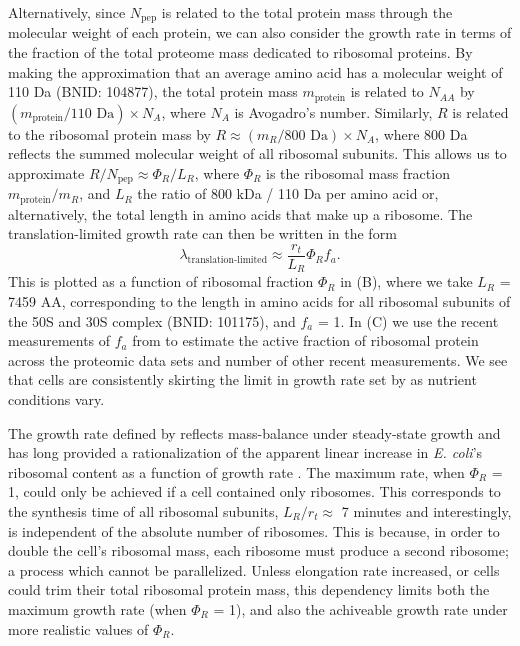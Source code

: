 Alternatively, since $N_\text{pep}$ is related to the total protein mass through
the molecular weight of each protein, we can also consider the growth rate in
terms of the fraction of the total proteome mass dedicated to ribosomal
proteins. By making the approximation that an average amino acid has a molecular
weight of 110 Da (BNID: 104877), the total protein mass $m_{\textrm{protein}}$
is related to $N_{AA}$ by $(m_{\textrm{protein}}/\text{110 Da}) \times N_A$,
where $N_A$ is Avogadro's number. Similarly, $R$ is related to the ribosomal
protein mass by $R \approx (m_R/\text{800 Da}) \times N_A$, where 800 Da
reflects the summed molecular weight of all ribosomal subunits.  This allows us
to approximate  $R / N_\text{pep} \approx \Phi_R / L_R$,  where $\Phi_R$ is the
ribosomal mass fraction $m_{\textrm{protein}}/m_R$, and $L_R$ the ratio of 800
kDa / 110 Da per amino acid or, alternatively, the total length in amino acids
that make up a ribosome. The translation-limited growth rate can then be written
in the form
\begin{equation}
\lambda_{\textrm{translation-limited}} \approx \frac{r_t}{L_R}  \Phi_R f_a.
\label{eq:translation_limit_growth_rate}
\end{equation}
This is plotted as a function of ribosomal fraction $\Phi_R$ in
(B), where we take $L_R$ = 7459 AA, corresponding to the
length in amino acids for all ribosomal subunits of the 50S and 30S complex
(BNID: 101175), and $f_a$ = 1. In (C) we use the
recent measurements of $f_a$ from \cite{dai2016} to estimate the active fraction of
ribosomal protein across the proteomic data sets and number of other recent
measurements. We see that cells are consistently skirting the limit in growth
rate set by  as nutrient conditions vary.

The growth rate defined by  reflects
mass-balance under steady-state growth and has long provided a rationalization
of the apparent linear increase in \textit{E. coli}'s ribosomal content as a
function of growth rate \citep{goldberger1979, scott2010}. The maximum rate,
when $\Phi_R$ = 1, could only be achieved if a cell contained only ribosomes.
This corresponds to the synthesis time of all ribosomal subunits, $L_R/ r_t
\approx$ 7 minutes \citep{dill2011} and interestingly, is independent of the
absolute number of ribosomes.  This is because, in order to double the cell's
ribosomal mass, each ribosome must produce a second ribosome; a process which
cannot be parallelized. Unless elongation rate increased, or cells could trim
their total ribosomal protein mass, this dependency limits both the maximum
growth rate (when $\Phi_R$ = 1), and also the achiveable growth rate under more
realistic values of $\Phi_R$.

